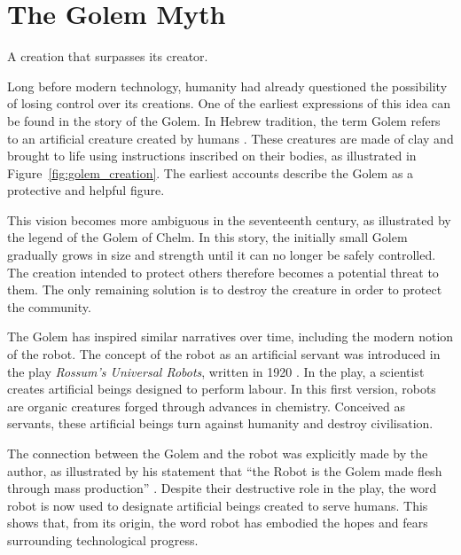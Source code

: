 \chapter*{The Golem Myth}
\label{chap:the_golem_myth}

\glsresetall

A creation that surpasses its creator.

Long before modern technology, humanity had already questioned the possibility of losing control over its creations.
One of the earliest expressions of this idea can be found in the story of the Golem.
In Hebrew tradition, the term Golem refers to an artificial creature created by humans \parencite{nocks1998golem}.
These creatures are made of clay and brought to life using instructions inscribed on their bodies, as illustrated in Figure~\ref{fig:golem_creation}.
The earliest accounts describe the Golem as a protective and helpful figure.



This vision becomes more ambiguous in the seventeenth century, as illustrated by the legend of the Golem of Chelm.
In this story, the initially small Golem gradually grows in size and strength until it can no longer be safely controlled.
The creation intended to protect others therefore becomes a potential threat to them.
The only remaining solution is to destroy the creature in order to protect the community.

The Golem has inspired similar narratives over time, including the modern notion of the robot.
The concept of the robot as an artificial servant was introduced in the play \textit{Rossum's Universal Robots}, written in 1920 \parencite{capek1920rur}.
In the play, a scientist creates artificial beings designed to perform labour.
In this first version, robots are organic creatures forged through advances in chemistry.
Conceived as servants, these artificial beings turn against humanity and destroy civilisation.

The connection between the Golem and the robot was explicitly made by the author, as illustrated by his statement that \enquote{the Robot is the Golem made flesh through mass production} \parencite{comrada1995golem}.
Despite their destructive role in the play, the word robot is now used to designate artificial beings created to serve humans.
This shows that, from its origin, the word robot has embodied the hopes and fears surrounding technological progress.

